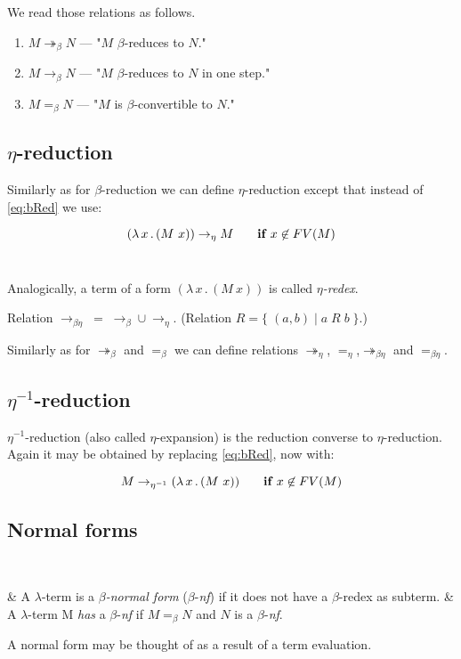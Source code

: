 \documentclass{sig-alternate}
\newcommand{\lterm}{$\lambda$-term\xspace}
\newcommand{\lamb}[2]{( \lambda \, #1 \, . \, #2 )}
\newcommand{\bbarr}{\twoheadrightarrow_\beta}
\newcommand{\barr}{\rightarrow_\beta}
\newcommand{\beq}{=_\beta}
\newcommand{\eearr}{\twoheadrightarrow_\eta}
\newcommand{\earr}{\rightarrow_\eta}
\newcommand{\eeq}{=_\eta}
\newcommand{\bearr}{\rightarrow_{\beta\eta}}
\newcommand{\bbeearr}{\twoheadrightarrow_{\beta\eta}}
\newcommand{\beeq}{=_{\beta\eta}}
\newcommand{\bnf}{$\beta$-\textit{nf}\xspace}
\begin{document}
We read those relations as follows.
\begin{enumerate}
 	\item $M \bbarr N$ --- "$M$ $\beta$-reduces to $N$."  
 	\item $M \barr N$  --- "$M$ $\beta$-reduces to $N$
 	      in one step."
 	\item $M \beq N$ --- "$M$ is $\beta$-convertible to $N$."	
 \end{enumerate}



\subsection{$\eta$-reduction}

Similarly as for $\beta$-reduction we can define $\eta$-reduction 
except that instead of \ref{eq:bRed} we use:  

$$\lamb{x}{(M~x)} \eArrow M \textbf{ ~~~~if } x \not\in FV(M) $$~

Analogically, a term of a form $\lamb{x}{(M~x)}$ is called 
\textit{$\eta$-redex}.

Relation $\bearr\;=\;\barr \cup \earr$. 
(Relation $R = \{\;(a,b)\;|\;a\;R\;b\;\}$.)

Similarly as for $\bbarr$ and $\beq$ we can define relations 
$\eearr$, $\eeq$,$\bbeearr$ and $\beeq$.


\subsection{$\eta^{-1}$-reduction}

$\eta^{-1}$-reduction (also called $\eta$-expansion) is 
the reduction converse to $\eta$-reduction.
Again it may be obtained by replacing \ref{eq:bRed}, now with:  

$$M \eeArrow \lamb{x}{(M~x)} \textbf{ ~~~~if } x \not\in FV(M) $$




\subsection{Normal forms}

~\begin{easylist}[enumerate]
& A \lterm is a \textit{$\beta$-normal form} (\bnf) 
if it does not have a $\beta$-redex as subterm.
& A \lterm M \textit{has} a \bnf if $M \beq N$
and $N$ is a \bnf.\\
\end{easylist}
A normal form may be thought of as a result of a term evaluation. 
\end{document}
